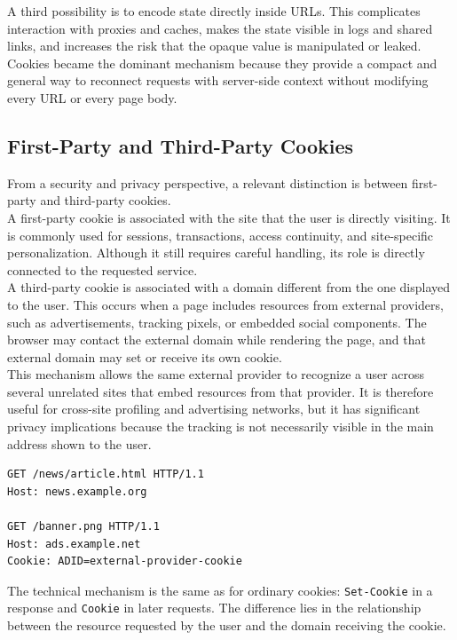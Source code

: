 \documentclass{scrbook}
\begin{document}
A third possibility is to encode state directly inside URLs. This complicates interaction with proxies and caches, makes the state visible in logs and shared links, and increases the risk that the opaque value is manipulated or leaked.\\

Cookies became the dominant mechanism because they provide a compact and general way to reconnect requests with server-side context without modifying every URL or every page body.

\subsection{First-Party and Third-Party Cookies}

From a security and privacy perspective, a relevant distinction is between first-party and third-party cookies.\\

A first-party cookie is associated with the site that the user is directly visiting. It is commonly used for sessions, transactions, access continuity, and site-specific personalization. Although it still requires careful handling, its role is directly connected to the requested service.\\

A third-party cookie is associated with a domain different from the one displayed to the user. This occurs when a page includes resources from external providers, such as advertisements, tracking pixels, or embedded social components. The browser may contact the external domain while rendering the page, and that external domain may set or receive its own cookie.\\

This mechanism allows the same external provider to recognize a user across several unrelated sites that embed resources from that provider. It is therefore useful for cross-site profiling and advertising networks, but it has significant privacy implications because the tracking is not necessarily visible in the main address shown to the user.

\begin{lstlisting}
GET /news/article.html HTTP/1.1
Host: news.example.org

GET /banner.png HTTP/1.1
Host: ads.example.net
Cookie: ADID=external-provider-cookie
\end{lstlisting}

The technical mechanism is the same as for ordinary cookies: \texttt{Set-Cookie} in a response and \texttt{Cookie} in later requests. The difference lies in the relationship between the resource requested by the user and the domain receiving the cookie.\\
\end{document}
